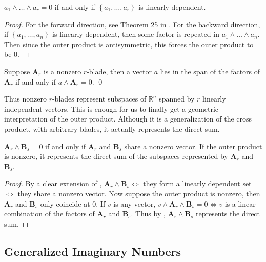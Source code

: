 \documentclass[twoside,10pt]{article}
\begin{document}
\begin{prop}
	\label{OP-zero}
$a_1 \wedge \dots \wedge a_r = 0$ if and only if $\left\{ a_1, \dots, a_r \right\}$ is linearly dependent.
\end{prop}
\begin{proof}
	For the forward direction, see Theorem 25 in \cite{chisolm}. For the backward direction, if $\left\{ a_1, \dots, a_n \right\}$ is linearly dependent, then some factor is repeated in $a_1 \wedge \dots \wedge a_n$. Then since the outer product is antisymmetric, this forces the outer product to be 0.
\end{proof}

\begin{cor}
	\label{wedge-lin-dep}
	Suppose $\mathbf{A}_r$ is a nonzero $r$-blade, then a vector $a$ lies in the span of the factors of $\mathbf{A}_r$ if and only if $a \wedge \mathbf{A}_r=0$. \qed
\end{cor}

Thus nonzero $r$-blades represent subspaces of $\mathbb{R}^{n}$ spanned by $r$ linearly independent vectors. This is enough for us to finally get a geometric interpretation of the outer product. Although it is a generalization of the cross product, with arbitrary blades, it actually represents the direct sum.

\begin{thrm}[]
$\mathbf{A}_{r} \wedge \mathbf{B}_{s} = 0$ if and only if $\mathbf{A}_{r}$ and $\mathbf{B}_{s}$ share a nonzero vector. If the outer product is nonzero, it represents the direct sum of the subspaces represented by $\mathbf{A}_r$ and $\mathbf{B}_s$.
\end{thrm}
\begin{proof}
	By a clear extension of , $\mathbf{A}_r \wedge \mathbf{B}_s \iff$ they form a linearly dependent set $\iff$ they share a nonzero vector. Now suppose the outer product is nonzero, then $\mathbf{A}_r$ and $\mathbf{B}_s$ only coincide at 0. If $v$ is any vector, $v \wedge \mathbf{A}_r \wedge \mathbf{B}_s = 0 \iff v$ is a linear combination of the factors of $\mathbf{A}_r$ and $\mathbf{B}_s$. Thus by , $\mathbf{A}_r \wedge \mathbf{B}_s$ represents the direct sum.
\end{proof}

\subsection{Generalized Imaginary Numbers}
\end{document}
